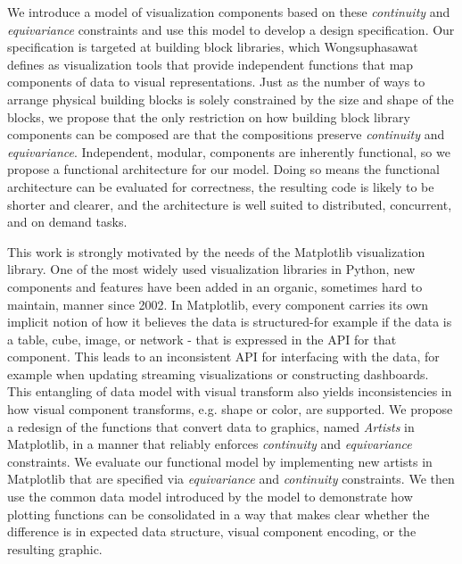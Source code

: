\documentclass[../main.tex]{subfiles}
\begin{document}
We introduce a model of visualization components based on these \textit{continuity} and \textit{equivariance} constraints and use this model to develop a design specification. Our specification is targeted at building block libraries, which Wongsuphasawat defines as visualization tools that provide independent functions that map components of data to visual representations\cite{wongsuphasawatNavigatingWideWorld2021}.  Just as the number of ways to arrange physical building blocks is solely constrained by the size and shape of the blocks, we propose that the only restriction on how building block library components can be composed are that the compositions preserve \textit{continuity} and \textit{equivariance}. Independent, modular, components are inherently functional\cite{hughesWhyFunctionalProgramming1989}, so we propose a functional architecture for our model. Doing so means the functional architecture can be evaluated for correctness, the resulting code is likely to be shorter and clearer, and the architecture is well suited to distributed, concurrent, and on demand tasks\cite{huHowFunctionalProgramming2015}.

This work is strongly motivated by the needs of the Matplotlib\cite{hunterMatplotlib2DGraphics2007,hunterArchitectureOpenSource} visualization library. One of the most widely used visualization libraries in Python, new components and features have been added in an organic, sometimes hard to maintain, manner since 2002.  In Matplotlib, every component carries its own implicit notion of how it believes the data is structured-for example if the data is a table, cube, image, or network - that is expressed in the API for that component. This leads to an inconsistent API for interfacing with the data, for example when  updating streaming visualizations or constructing dashboards\cite{a.sarikayaWhatWeTalk2019}. This entangling of data model with visual transform also yields inconsistencies in how visual component transforms, e.g. shape or color, are supported. We propose a redesign of the functions that convert data to graphics, named \textit{Artists} in Matplotlib, in a manner that reliably enforces \textit{continuity} and \textit{equivariance} constraints. We evaluate our functional model by implementing new artists in Matplotlib that are specified via \textit{equivariance} and \textit{continuity} constraints. We then use the common data model introduced by the model to demonstrate how plotting functions can be consolidated in a way that makes clear whether the difference is in expected data structure, visual component encoding, or the resulting graphic.
\end{document}
